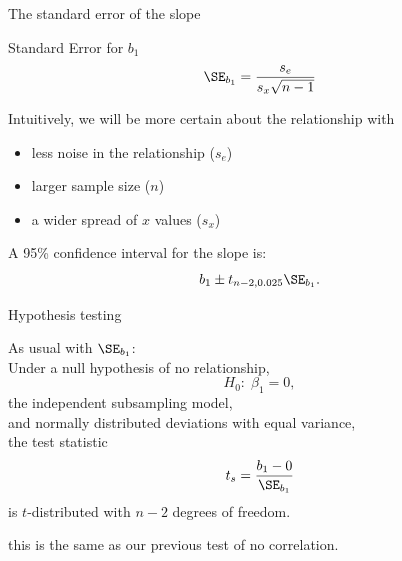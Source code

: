 \begin{frame}{The standard error of the slope}


  \begin{block}{Standard Error for $b_1$}
      \[
          \SE_{b_1} = \frac{ s_e }{ s_x \sqrt{n-1} }
      \]
  \end{block}

    \vspace{2em}
    
    \pause

    Intuitively,
    we will be more certain about the relationship with
    \begin{itemize}
        \item less noise in the relationship ($s_e$)
        \item larger sample size ($n$)
        \item a wider spread of $x$ values ($s_x$)
    \end{itemize}

    \vspace{2em}

    A \alert{95\% confidence interval} for the slope is:
    \[
        b_1 \pm t_{n-2,0.025} \SE_{b_1} .
    \]

\end{frame}


\begin{frame}{Hypothesis testing}

    As usual with $\SE_{b_1}$: \\
    Under a null hypothesis of no relationship,
    \[
        H_0: \; \beta_1 = 0 ,
    \]
    the independent subsampling model, \\
    and normally distributed deviations with equal variance, \\
    the test statistic 
    \[
        t_s = \frac{b_1 - 0}{\SE_{b_1}}
    \]
    is $t$-distributed with $n-2$ degrees of freedom.

    \vspace{2em}

     this is the \alert{same} as our previous test of no correlation.

\end{frame}

